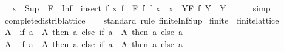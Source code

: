 \begin{isabellebody}
\ \isamarkupfalse%
\ {\isachardoublequoteopen}{\isasymSqunion}x\ {\isasymsqinter}\ {\isasymSqinter}{\isacharparenleft}{\kern0pt}Sup\ {\isacharbackquote}{\kern0pt}\ F{\isacharparenright}{\kern0pt}\ {\isasymle}\ {\isasymSqunion}{\isacharparenleft}{\kern0pt}Inf\ {\isacharbackquote}{\kern0pt}\ {\isacharbraceleft}{\kern0pt}insert\ {\isacharparenleft}{\kern0pt}f\ x{\isacharparenright}{\kern0pt}\ {\isacharparenleft}{\kern0pt}f\ {\isacharbackquote}{\kern0pt}\ F{\isacharparenright}{\kern0pt}\ {\isacharbar}{\kern0pt}f{\isachardot}{\kern0pt}\ f\ x\ {\isasymin}\ x\ {\isasymand}\ {\isacharparenleft}{\kern0pt}{\isasymforall}Y{\isasymin}F{\isachardot}{\kern0pt}\ f\ Y\ {\isasymin}\ Y{\isacharparenright}{\kern0pt}{\isacharbraceright}{\kern0pt}{\isacharparenright}{\kern0pt}{\isachardoublequoteclose}\isanewline
\ \ \ \ \isamarkupfalse%
\ simp\isanewline
{}\isamarkupfalse%
%
\endisatagproof
{\isafoldproof}%
%
\isadelimproof
\isanewline
%
\endisadelimproof
\isanewline
{}\isamarkupfalse%
\ complete{\isacharunderscore}{\kern0pt}distrib{\isacharunderscore}{\kern0pt}lattice\isanewline
%
\isadelimproof
\ \ %
\endisadelimproof
%
\isatagproof
{}\isamarkupfalse%
\ {\isacharparenleft}{\kern0pt}standard{\isacharcomma}{\kern0pt}\ rule\ finite{\isacharunderscore}{\kern0pt}Inf{\isacharunderscore}{\kern0pt}Sup{\isacharparenright}{\kern0pt}%
\endisatagproof
{\isafoldproof}%
%
\isadelimproof
\isanewline
%
\endisadelimproof
{}\isamarkupfalse%
\isanewline
\isanewline
{}\isamarkupfalse%
\ finite{\isacharunderscore}{\kern0pt}{}\ {\isacharcolon}{\kern0pt}{\isacharcolon}{\kern0pt}\ finite{\isacharunderscore}{\kern0pt}lattice\isanewline
{}\isanewline
\isanewline
{}\isamarkupfalse%
\ {\isachardoublequoteopen}{\isasymSqinter}A\ {\isacharequal}{\kern0pt}\ {\isacharparenleft}{\kern0pt}if\ a\ {\isasymin}\ A\ then\ a\ else\ if\ a\ {\isasymin}\ A\ then\ a\ else\ a\isanewline
{}\isamarkupfalse%
\ {\isachardoublequoteopen}{\isasymSqunion}A\ {\isacharequal}{\kern0pt}\ {\isacharparenleft}{\kern0pt}if\ a\ {\isasymin}\ A\ then\ a\ else\ if\ a\ {\isasymin}\ A\ then\ a\ else\ a\isanewline

\end{isabellebody}
